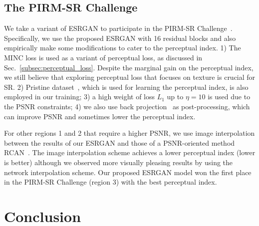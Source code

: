 \documentclass[runningheads]{llncs}
\begin{document}
\subsection{The PIRM-SR Challenge} \label{sec:prim18}
We take a variant of ESRGAN to participate in the PIRM-SR Challenge~\cite{pirm18url}.
Specifically, we use the proposed ESRGAN with 16 residual blocks and also empirically make some modifications to cater 
to the perceptual index.
1) The MINC loss is used as a variant of perceptual loss, as discussed in Sec.~\ref{subsec:perceptual_loss}. 
Despite the marginal gain on the perceptual index, we still believe that exploring perceptual loss that focuses on 
texture is 
crucial for SR.
2) Pristine dataset~\cite{mittal2013making}, which is used for learning the perceptual index, is also employed in our 
training;
3) a high weight of loss $L_1$ up to $\eta=10$ is used due to the PSNR constraints;
4) we also use back projection~\cite{timofte2016seven} as post-processing, which can improve PSNR and sometimes 
lower the perceptual index.


For other regions 1 and 2 that require a higher PSNR, we use image interpolation between the results of our ESRGAN and  
those of a PSNR-oriented method RCAN~\cite{zhang2018image}. 
%
The image interpolation scheme achieves a lower perceptual index (lower is better) although we observed more visually 
pleasing results by using the network interpolation scheme.
%
%
Our proposed ESRGAN model won the first place in the PIRM-SR Challenge (region 3) with the best perceptual index.
%
%

\section{Conclusion}
\end{document}
